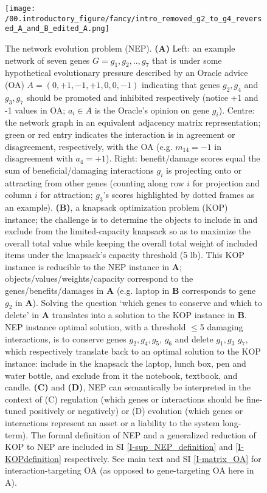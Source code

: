\begin{figure}[H]%
    \centering
    \texttt{[image: /00.introductory\_figure/fancy/intro\_removed\_g2\_to\_g4\_reversed\_A\_and\_B\_edited\_A.png]} %
    \caption{
                The network evolution problem (NEP).
                \textbf{(A)} Left: an example network of seven genes $G={g_1,g_2, .., g_7}$ that is under some hypothetical evolutionary pressure described by an Oracle advice (OA) $A=(0,+1,-1,+1,0,0,-1)$ indicating that genes $g_2,g_4$ and $g_3,g_7$ should be promoted and inhibited respectively (notice +1 and -1 values in OA;  $a_i\in A$ is the Oracle's opinion on gene $g_i$). Centre: the network graph in an equivalent adjacency matrix representation; green or red entry indicates the interaction is in agreement or disagreement, respectively,  with the OA (e.g. $m_{14}=-1$ in disagreement with $a_4=+1$). Right: benefit/damage scores equal the sum of beneficial/damaging interactions $g_i$ is projecting onto or attracting from other genes (counting along row $i$ for projection and column $i$ for attraction; $g_3$'s scores  highlighted by dotted frames as an example).
                \textbf{(B)}, a knapsack optimization problem (KOP) instance; the challenge is to determine the objects to include in and exclude from the limited-capacity knapsack so as to maximize the overall total value while keeping the overall total weight of included items under the knapsack's capacity threshold (5 lb). This KOP instance is reducible to the NEP instance in \textbf{A}; objects/values/weights/capacity correspond to the genes/benefits/damages in \textbf{A}  (e.g. laptop in \textbf{B} corresponds to gene $g_2$ in \textbf{A}). Solving the question `which genes to conserve and which to delete' in \textbf{A} translates into a solution to the KOP instance in \textbf{B}. NEP instance optimal solution, with a threshold $\leq$5 damaging interactions, is to conserve genes $g_2, g_4,  g_5$, $g_6$ and delete $g_1, g_3$  $g_7$, which respectively translate back to an optimal solution to the KOP instance: include in the knapsack the laptop, lunch box, pen and water bottle, and exclude from it the notebook, textbook, and candle.
                \textbf{(C)} and \textbf{(D)}, NEP can semantically be interpreted in the context of (C) regulation (which genes or interactions should be fine-tuned positively or negatively) or (D) evolution (which genes or interactions represent an asset or a liability to the system long-term). The formal definition of NEP and a generalized reduction of KOP to NEP are included in SI \ref{I-sup_NEP_definition} and \ref{I-KOPdefinition} respectively. See main text and SI \ref{I-matrix_OA} for interaction-targeting OA (as opposed to gene-targeting OA here in A). }
    \label{fig:intro_fancy}
    \end{figure}

